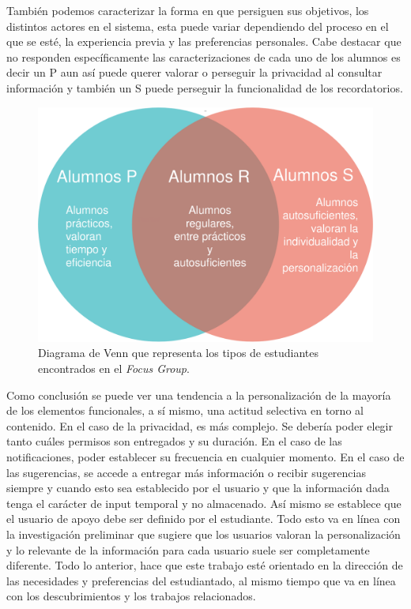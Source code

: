     \par También podemos caracterizar la forma en que persiguen sus objetivos, los distintos actores en el sistema, esta puede variar dependiendo del proceso en el que se esté, la experiencia previa y las preferencias personales. Cabe destacar que no responden específicamente las caracterizaciones de cada uno de los alumnos es decir un \acrshort{P} aun así puede querer valorar o perseguir la privacidad al consultar información y también un \acrshort{S} puede perseguir la funcionalidad de los recordatorios.
    \begin{figure}[h]
        \centering
        \includegraphics[scale=0.2]{media/imagenes/focus_groups/Tipos_de_alumnos-Diagrama_de_Venn.png}
        \caption[Diagrama Tipos de alumnos]{Diagrama de Venn que representa los tipos de estudiantes encontrados en el \textit{Focus Group}.}
        \label{fig:alumnosVenn}
    \end{figure}
    \par Como conclusión se puede ver una tendencia a la personalización de la mayoría de los elementos funcionales, a sí mismo, una actitud selectiva en torno al contenido. En el caso de la privacidad, es más complejo. Se debería poder elegir tanto cuáles permisos son entregados y su duración. En el caso de las notificaciones, poder establecer su frecuencia en cualquier momento. En el caso de las sugerencias, se accede a entregar más información o recibir sugerencias siempre y cuando esto sea establecido por el usuario y que la información dada tenga el carácter de input temporal y no almacenado. Así mismo se establece que el usuario de apoyo debe ser definido por el estudiante. Todo esto va en línea con la investigación preliminar que sugiere que los usuarios valoran la personalización y lo relevante de la información para cada usuario suele ser completamente diferente. Todo lo anterior, hace que este trabajo esté orientado en la dirección de las necesidades y preferencias del estudiantado, al mismo tiempo que va en línea con los descubrimientos y los trabajos relacionados.

